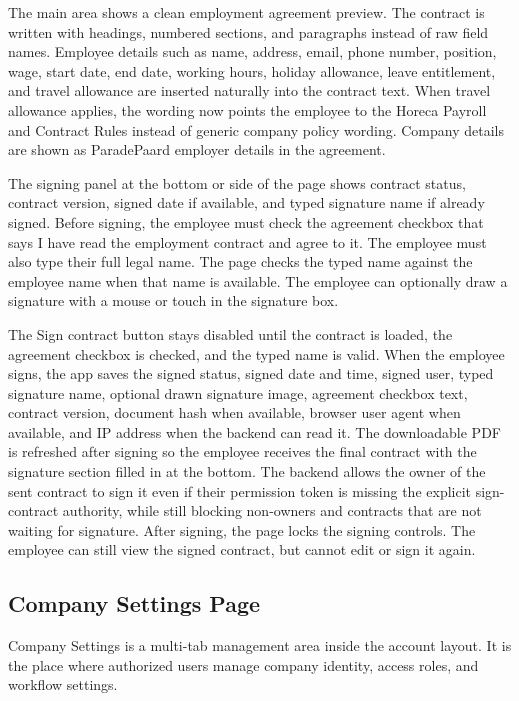 \documentclass[11pt]{article}
\begin{document}
The main area shows a clean employment agreement preview. The contract is written with headings, numbered sections, and paragraphs instead of raw field names. Employee details such as name, address, email, phone number, position, wage, start date, end date, working hours, holiday allowance, leave entitlement, and travel allowance are inserted naturally into the contract text. When travel allowance applies, the wording now points the employee to the Horeca Payroll and Contract Rules instead of generic company policy wording. Company details are shown as ParadePaard employer details in the agreement.

The signing panel at the bottom or side of the page shows contract status, contract version, signed date if available, and typed signature name if already signed. Before signing, the employee must check the agreement checkbox that says I have read the employment contract and agree to it. The employee must also type their full legal name. The page checks the typed name against the employee name when that name is available. The employee can optionally draw a signature with a mouse or touch in the signature box.

The Sign contract button stays disabled until the contract is loaded, the agreement checkbox is checked, and the typed name is valid. When the employee signs, the app saves the signed status, signed date and time, signed user, typed signature name, optional drawn signature image, agreement checkbox text, contract version, document hash when available, browser user agent when available, and IP address when the backend can read it. The downloadable PDF is refreshed after signing so the employee receives the final contract with the signature section filled in at the bottom. The backend allows the owner of the sent contract to sign it even if their permission token is missing the explicit sign-contract authority, while still blocking non-owners and contracts that are not waiting for signature. After signing, the page locks the signing controls. The employee can still view the signed contract, but cannot edit or sign it again.

\subsection{Company Settings Page}

Company Settings is a multi-tab management area inside the account layout. It is the place where authorized users manage company identity, access roles, and workflow settings.
\end{document}
